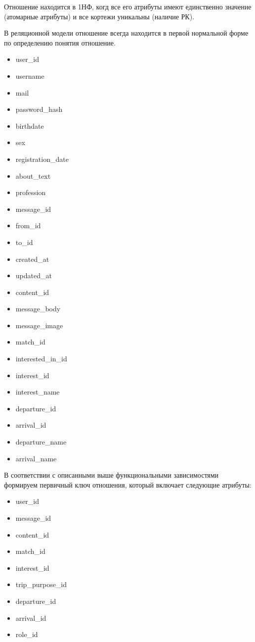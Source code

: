 Отношение находится в 1НФ, когд все его атрибуты имеют единственно значение (атомарные атрибуты) и все кортежи уникальны (наличие РК).

В реляционной модели отношение всегда находится в первой нормальной форме по определению понятия отношение.

\begin{itemize}
    \item user\_id
    \item username
    \item mail
    \item password\_hash
    \item birthdate
    \item sex
    \item registration\_date
    \item about\_text
    \item profession
    \item message\_id
    \item from\_id
    \item to\_id
    \item created\_at
    \item updated\_at
    \item content\_id
    \item message\_body
    \item message\_image
    \item match\_id
    \item interested\_in\_id
    \item interest\_id
    \item interest\_name
    \item departure\_id
    \item arrival\_id
    \item departure\_name
    \item arrival\_name
\end{itemize}

В соответствии с описанными выше функциональными зависимостями формируем первичный ключ отношения, который включает следующие атрибуты:

\begin{itemize}
    \item user\_id
    \item message\_id
    \item content\_id
    \item match\_id
    \item interest\_id
    \item trip\_purpose\_id
    \item departure\_id
    \item arrival\_id
    \item role\_id
\end{itemize}


